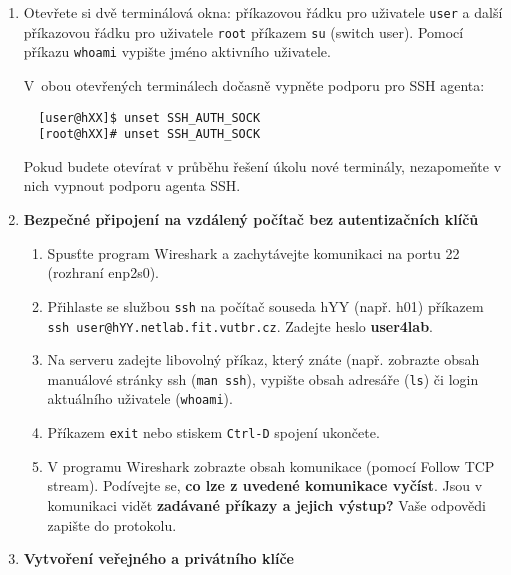 \documentclass[a4paper,11pt]{article}
\begin{document}
\begin{enumerate}

  \item Otevřete si dvě terminálová okna: příkazovou řádku pro uživatele {\tt user} a další
    příkazovou řádku pro uživatele {\tt root} příkazem {\tt su} (switch user).
Pomocí příkazu {\tt whoami} vypište jméno aktivního uživatele. 

    V~obou otevřených terminálech dočasně vypněte podporu pro SSH agenta:
  \begin{lstlisting}
  [user@hXX]$ unset SSH_AUTH_SOCK
  [root@hXX]# unset SSH_AUTH_SOCK
  \end{lstlisting}

  Pokud budete otevírat v průběhu řešení úkolu nové terminály, nezapomeňte
  v nich vypnout podporu agenta SSH.

  \item {\bf Bezpečné připojení na vzdálený počítač bez autentizačních klíčů}

    \begin{enumerate}

      \item Spusťte program Wireshark a zachytávejte komunikaci na portu 22
        (rozhraní enp2s0).

      \item Přihlaste se službou {\tt ssh} na počítač souseda hYY (např. h01) příkazem \\
        {\tt ssh user@hYY.netlab.fit.vutbr.cz}. Zadejte heslo \textbf{user4lab}.

      \item Na serveru zadejte libovolný příkaz, který znáte (např. zobrazte
        obsah manuálové stránky ssh ({\tt man ssh}), vypište
        obsah adresáře ({\tt ls}) či login aktuálního uživatele ({\tt whoami}).

      \item Příkazem {\tt exit} nebo stiskem {\tt Ctrl-D} spojení ukončete.

      \item V programu Wireshark zobrazte obsah komunikace (pomocí Follow TCP stream).
        Podívejte se, \textbf{co lze z uvedené komunikace vyčíst}. Jsou v komunikaci vidět
        \textbf{zadávané příkazy a jejich výstup?} Vaše odpovědi zapište do protokolu.
    \end{enumerate}

  \item {\bf Vytvoření veřejného a privátního klíče}


\end{enumerate}
\end{document}
